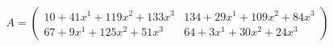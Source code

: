 \documentclass[preview]{standalone}
\begin{document}
\begin{align*}
A = \begin{pmatrix}10 + 41x^{1} + 119x^{2} + 133x^{3} & 134 + 29x^{1} + 109x^{2} + 84x^{3} \\ 67 + 9x^{1} + 125x^{2} + 51x^{3} & 64 + 3x^{1} + 30x^{2} + 24x^{3}\end{pmatrix}
\end{align*}
\end{document}
